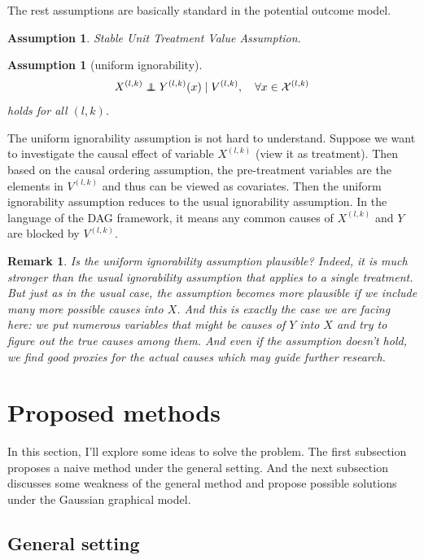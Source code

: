 \documentclass[11pt]{article}
\newtheorem{remark}{Remark}[section]
\newtheorem{assume}[thm]{Assumption}
\newcommand{\cX}{\mathcal{X}}
\newcommand\indpt{\protect\mathpalette{\protect\indpT}{\perp}}
\def\indpT#1#2{\mathrel{\rlap{$#1#2$}\mkern2mu{#1#2}}}
\begin{document}
The rest assumptions are basically standard in the potential outcome model.
\begin{assume}
    Stable Unit Treatment Value Assumption.
\end{assume}

\begin{assume}[uniform ignorability]
    \[ X^{(l,k)} \indpt Y^{(l,k)}(x) \mid V^{(l,k)}, \quad \forall x \in \cX^{(l,k)} \]
    holds for all $(l,k)$.
\end{assume}
The uniform ignorability assumption is not hard to understand. Suppose we want to investigate the causal effect of variable $X^{(l,k)}$ (view it as treatment). Then based on the causal ordering assumption, the pre-treatment variables are the elements in $V^{(l,k)}$ and thus can be viewed as covariates. Then the uniform ignorability assumption reduces to the usual ignorability assumption. In the language of the DAG framework, it means any common causes of $X^{(l,k)}$ and $Y$ are blocked by $V^{(l,k)}$.

\begin{remark}
    Is the uniform ignorability assumption plausible? Indeed, it is much stronger than the usual ignorability assumption that applies to a single treatment. But just as in the usual case, the assumption becomes more plausible if we include many more possible causes into $X$. And this is exactly the case we are facing here: we put numerous variables that might be causes of $Y$ into $X$ and try to figure out the true causes among them. And even if the assumption doesn't hold, we find good proxies for the actual causes which may guide further research.
\end{remark}

\section{Proposed methods}%
\label{sec:proposed_methods}

In this section, I'll explore some ideas to solve the problem. The first subsection proposes a naive method under the general setting. And the next subsection discusses some weakness of the general method and propose possible solutions under the Gaussian graphical model.

\subsection{General setting}%
\label{sub:general_setting}
\end{document}
